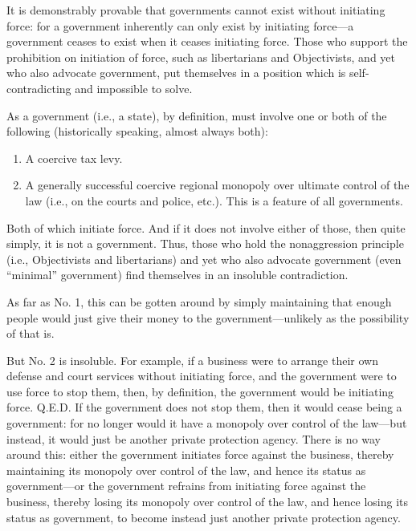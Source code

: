 \documentclass[letterpaper,12pt]{article}
\begin{document}
It is demonstrably provable that governments cannot exist without initiating force: for a government inherently can only exist by initiating force---a government ceases to exist when it ceases initiating force. Those who support the prohibition on initiation of force, such as libertarians and Objectivists, and yet who also advocate government, put themselves in a position which is self-contradicting and impossible to solve.

As a government (i.e., a state), by definition, must involve one or both of the following (historically speaking, almost always both):

\begin{enumerate}
\small
\item A coercive tax levy.

\item A generally successful coercive regional monopoly over ultimate control of the law (i.e., on the courts and police, etc.). This is a feature of all governments.
\end{enumerate}

Both of which initiate force. And if it does not involve either of those, then quite simply, it is not a government. Thus, those who hold the nonaggression principle (i.e., Objectivists and libertarians) and yet who also advocate government (even ``minimal'' government) find themselves in an insoluble contradiction.

As far as No. 1, this can be gotten around by simply maintaining that enough people would just give their money to the government---unlikely as the possibility of that is.

But No. 2 is insoluble. For example, if a business were to arrange their own defense and court services without initiating force, and the government were to use force to stop them, then, by definition, the government would be initiating force. Q.E.D. If the government does not stop them, then it would cease being a government: for no longer would it have a monopoly over control of the law---but instead, it would just be another private protection agency. There is no way around this: either the government initiates force against the business, thereby maintaining its monopoly over control of the law, and hence its status as government---or the government refrains from initiating force against the business, thereby losing its monopoly over control of the law, and hence losing its status as government, to become instead just another private protection agency.
\end{document}
